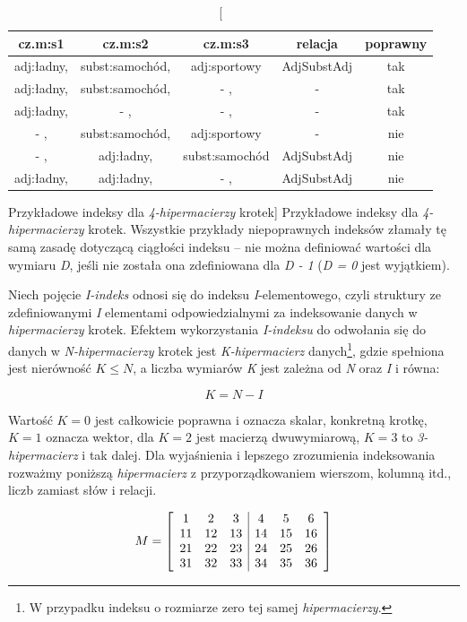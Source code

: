 \documentclass[11pt,a4paper]{llncs}
\begin{document}
\begin{table}[h!]
\centering
\begin{tabular}{c c c c c}
\toprule
\textbf{cz.m:s1} & \textbf{cz.m:s2} & \textbf{cz.m:s3} & \textbf{relacja}  & \textbf{poprawny} \\
\midrule
adj:ładny, 	& subst:samochód, 	& adj:sportowy		& AdjSubstAdj	& tak \\
adj:ładny, 	& subst:samochód, 	& - ,			& -		& tak \\
adj:ładny,	& - ,			& - ,			& -		& tak \\
- ,		& subst:samochód, 	& adj:sportowy 		& -		& nie \\
- ,		& adj:ładny,		& subst:samochód	& AdjSubstAdj	& nie \\
adj:ładny,	& adj:ładny,		& - ,			& AdjSubstAdj	& nie \\
\bottomrule
\end{tabular}
\caption
	[Przykładowe indeksy dla \emph{4-hipermacierzy} krotek]
	{Przykładowe indeksy dla \emph{4-hipermacierzy} krotek. Wszystkie przykłady niepoprawnych indeksów złamały tę samą zasadę dotyczącą ciągłości indeksu -- nie można definiować wartości dla wymiaru \emph{D}, jeśli nie została ona zdefiniowana dla \emph{D - 1} (\emph{D = 0} jest wyjątkiem).}
\label{hypermatrix_indices}
\end{table}


Niech pojęcie \emph{I-indeks} odnosi się do indeksu \emph{I}-elementowego, czyli struktury ze zdefiniowanymi \emph{I} elementami odpowiedzialnymi za indeksowanie danych w \emph{hipermacierzy} krotek.
Efektem wykorzystania \emph{I-indeksu} do odwołania się do danych w \emph{N-hipermacierzy} krotek jest \emph{K-hipermacierz} danych\footnote{W przypadku indeksu o rozmiarze zero tej samej \emph{hipermacierzy}.}, gdzie spełniona jest nierówność $ K \leq N $, a liczba wymiarów \emph{K} jest zależna od \emph{N} oraz \emph{I} i równa:

$$ K = N - I $$

Wartość $K = 0$ jest całkowicie poprawna i oznacza skalar, konkretną krotkę, $K = 1$ oznacza wektor, dla $K = 2$ jest macierzą dwuwymiarową, $K = 3$ to \emph{3-hipermacierz} i tak dalej.
Dla wyjaśnienia i lepszego zrozumienia indeksowania rozważmy poniższą \emph{hipermacierz} z przyporządkowaniem wierszom, kolumną itd., liczb zamiast słów i relacji.

\begin{center}
\[
M = 
\left[
\begin{array}{c c c | c c c}
1 	& 2 	& 3 	& 4 	& 5 	& 6 	\\
11 	& 12 	& 13 	& 14 	& 15 	& 16 	\\
21 	& 22 	& 23 	& 24 	& 25 	& 26 	\\
31 	& 32 	& 33 	& 34 	& 35	& 36 	\\
\end{array}
\right]
\]
\end{center}
\end{document}
